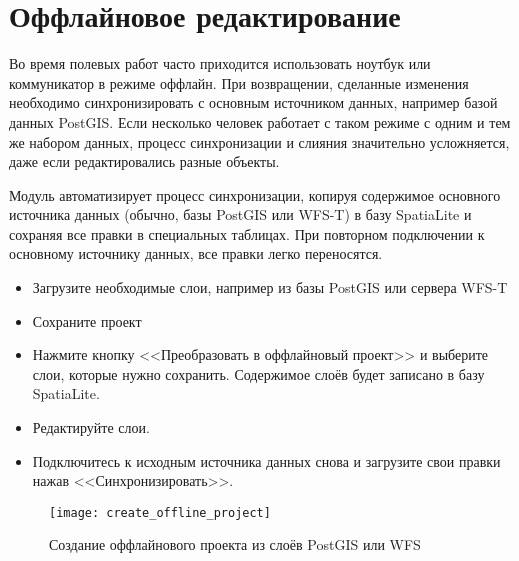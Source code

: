 
\section{Оффлайновое редактирование}\label{sec:offlinedit}


Во время полевых работ часто приходится использовать ноутбук или коммуникатор
в режиме оффлайн. При возвращении, сделанные изменения необходимо синхронизировать
с основным источником данных, например базой данных PostGIS. Если несколько
человек работает с таком режиме с одним и тем же набором данных, процесс
синхронизации и слияния значительно усложняется, даже если редактировались
разные объекты.

Модуль  автоматизирует
процесс синхронизации, копируя содержимое основного источника данных (обычно,
базы PostGIS или WFS-T) в базу SpatiaLite и сохраняя все правки в специальных
таблицах. При повторном подключении к основному источнику данных, все правки
легко переносятся.


\begin{itemize}
\item Загрузите необходимые слои, например из базы PostGIS или сервера WFS-T
\item Сохраните проект
\item Нажмите кнопку <<Преобразовать в оффлайновый проект>> и выберите
слои, которые нужно сохранить. Содержимое слоёв будет записано в базу SpatiaLite.
\item Редактируйте слои.
\item Подключитесь к исходным источника данных снова и загрузите свои правки
нажав <<Синхронизировать>>.
\end{itemize}

\begin{figure}[ht]
   \centering
   \texttt{[image: create\_offline\_project]}
   \caption{Создание оффлайнового проекта из слоёв PostGIS или WFS \nixcaption}
   \label{fig:offlineproject}
\end{figure}

\FloatBarrier
